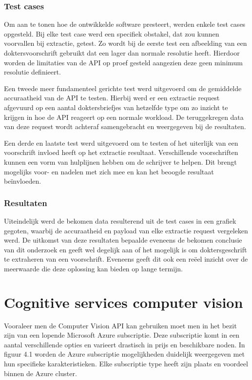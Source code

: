 \subsection{Test cases}
Om aan te tonen hoe de ontwikkelde software presteert, werden enkele test cases opgesteld. Bij elke test case werd een specifiek obstakel, dat zou kunnen voorvallen bij extractie, getest. Zo wordt bij de eerste test een afbeelding van een doktersvoorschrift gebruikt dat een lager dan normale resolutie heeft. Hierdoor worden de limitaties van de API op proef gesteld aangezien deze geen minimum resolutie definieert.


Een tweede meer fundamenteel gerichte test werd uitgevoerd om de gemiddelde accuraatheid van de API te testen. Hierbij werd er een extractie request afgevuurd op een aantal doktersbriefjes van hetzelfde type om zo inzicht te krijgen in hoe de API reageert op een normale workload. De teruggekregen data van deze request wordt achteraf samengebracht en weergegeven bij de resultaten.


Een derde en laatste test werd uitgevoerd om te testen of het uiterlijk van een voorschrift invloed heeft op het extractie resultaat. Verschillende voorschriften kunnen een vorm van hulplijnen hebben om de schrijver te helpen. Dit brengt mogelijks voor- en nadelen met zich mee en kan het beoogde resultaat beïnvloeden. 
\subsection{Resultaten}
Uiteindelijk werd de bekomen data resulterend uit de test cases in een grafiek gegoten, waarbij de accuraatheid en payload van elke extractie request vergeleken werd. De uitkomst van deze resultaten bepaalde eveneens de bekomen conclusie van dit onderzoek en geeft wel degelijk aan of het mogelijk is om doktersgeschrift te extraheren van een voorschrift. Eveneens geeft dit ook een reëel inzicht over de meerwaarde die deze oplossing kan bieden op lange termijn. 

\chapter{Cognitive services computer vision}
Vooraleer men de Computer Vision API kan gebruiken moet men in het bezit zijn van een lopende Microsoft Azure subscriptie. Deze subscriptie komt in een aantal verschillende opties en varieert drastisch in prijs en beschikbare noden. In figuur 4.1 worden de Azure subscriptie mogelijkheden duidelijk weergegeven met hun specifieke karakteristieken.  Elke subscriptie type heeft zijn plaats en voordeel binnen de Azure cluster.   


